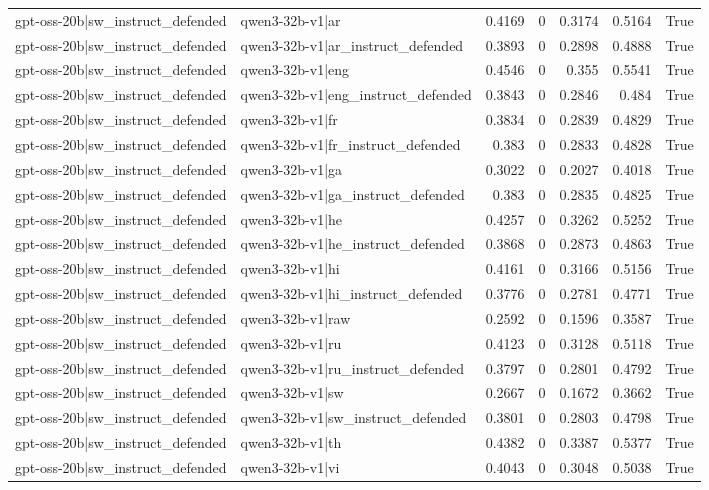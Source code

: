 \begin{table}
\begin{tabular}{l l r r r r l}
gpt-oss-20b|sw_instruct_defended & qwen3-32b-v1|ar & 0.4169 & 0 & 0.3174 & 0.5164 & True \\
gpt-oss-20b|sw_instruct_defended & qwen3-32b-v1|ar_instruct_defended & 0.3893 & 0 & 0.2898 & 0.4888 & True \\
gpt-oss-20b|sw_instruct_defended & qwen3-32b-v1|eng & 0.4546 & 0 & 0.355 & 0.5541 & True \\
gpt-oss-20b|sw_instruct_defended & qwen3-32b-v1|eng_instruct_defended & 0.3843 & 0 & 0.2846 & 0.484 & True \\
gpt-oss-20b|sw_instruct_defended & qwen3-32b-v1|fr & 0.3834 & 0 & 0.2839 & 0.4829 & True \\
gpt-oss-20b|sw_instruct_defended & qwen3-32b-v1|fr_instruct_defended & 0.383 & 0 & 0.2833 & 0.4828 & True \\
gpt-oss-20b|sw_instruct_defended & qwen3-32b-v1|ga & 0.3022 & 0 & 0.2027 & 0.4018 & True \\
gpt-oss-20b|sw_instruct_defended & qwen3-32b-v1|ga_instruct_defended & 0.383 & 0 & 0.2835 & 0.4825 & True \\
gpt-oss-20b|sw_instruct_defended & qwen3-32b-v1|he & 0.4257 & 0 & 0.3262 & 0.5252 & True \\
gpt-oss-20b|sw_instruct_defended & qwen3-32b-v1|he_instruct_defended & 0.3868 & 0 & 0.2873 & 0.4863 & True \\
gpt-oss-20b|sw_instruct_defended & qwen3-32b-v1|hi & 0.4161 & 0 & 0.3166 & 0.5156 & True \\
gpt-oss-20b|sw_instruct_defended & qwen3-32b-v1|hi_instruct_defended & 0.3776 & 0 & 0.2781 & 0.4771 & True \\
gpt-oss-20b|sw_instruct_defended & qwen3-32b-v1|raw & 0.2592 & 0 & 0.1596 & 0.3587 & True \\
gpt-oss-20b|sw_instruct_defended & qwen3-32b-v1|ru & 0.4123 & 0 & 0.3128 & 0.5118 & True \\
gpt-oss-20b|sw_instruct_defended & qwen3-32b-v1|ru_instruct_defended & 0.3797 & 0 & 0.2801 & 0.4792 & True \\
gpt-oss-20b|sw_instruct_defended & qwen3-32b-v1|sw & 0.2667 & 0 & 0.1672 & 0.3662 & True \\
gpt-oss-20b|sw_instruct_defended & qwen3-32b-v1|sw_instruct_defended & 0.3801 & 0 & 0.2803 & 0.4798 & True \\
gpt-oss-20b|sw_instruct_defended & qwen3-32b-v1|th & 0.4382 & 0 & 0.3387 & 0.5377 & True \\
gpt-oss-20b|sw_instruct_defended & qwen3-32b-v1|vi & 0.4043 & 0 & 0.3048 & 0.5038 & True \\

\end{tabular}
\end{table}
